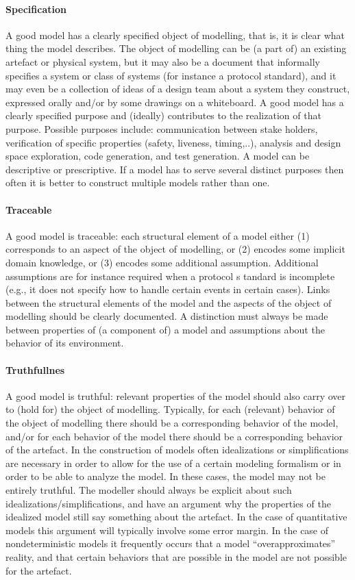\paragraph{Specification}
A good model has a clearly specified object of modelling, that is, it is clear what thing the model describes. The object of modelling can be (a part of) an existing artefact or physical system, but it may also be a document that informally specifies a system or class of systems (for instance a protocol standard), and it may even be a collection of ideas of a design team about a system they construct, expressed orally and/or by some drawings on a whiteboard.
A good model has a clearly specified purpose and (ideally) contributes to the realization of that purpose. Possible purposes include: communication between stake holders, verification of specific properties (safety, liveness, timing,..), analysis and design space exploration, code generation, and test generation. A model can be descriptive or prescriptive. If a model has to serve several distinct purposes then often it is better to construct multiple models rather than one.
\paragraph{Traceable}
A good model is traceable: each structural element of a model either (1) corresponds to an aspect of the object of modelling, or (2) encodes some implicit domain knowledge, or (3) encodes some additional assumption. Additional assumptions are for instance required when a protocol s tandard is incomplete (e.g., it does not specify how to handle certain events in certain cases). Links between the structural elements of the model and the aspects of the object of modelling should be clearly documented. A distinction must always be made between properties of (a component of) a model and assumptions about the behavior of its environment.
\paragraph{Truthfullnes}
A good model is truthful: relevant properties of the model should also carry over to (hold for) the object of modelling. Typically, for each (relevant) behavior of the object of modelling there should be a corresponding behavior of the model, and/or for each behavior of the model there should be a corresponding behavior of the artefact. In the construction of models often idealizations or simplifications are necessary in order to allow for the use of a certain modeling formalism or in order to be able to analyze the model. In these cases, the model may not be entirely truthful. The modeller should always be explicit about such idealizations/simplifications, and have an argument why the properties of the idealized model still say something about the artefact. In the case of quantitative models this argument will typically involve some error margin. In the case of nondeterministic models it frequently occurs that a model ``overapproximates'' reality, and that certain behaviors that are possible in the model are not possible for the artefact.
